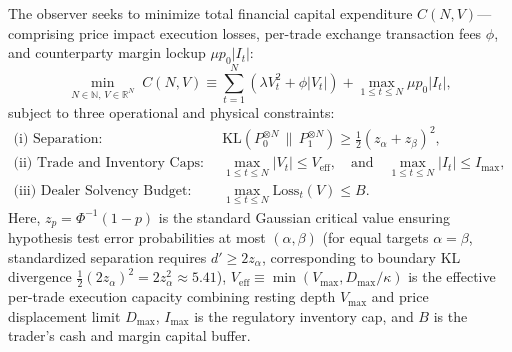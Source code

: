 \documentclass[12pt]{article}
\theoremstyle{definition}
\theoremstyle{remark}
\newcommand{\R}{\mathbb{R}}
\begin{document}
The observer seeks to minimize total financial capital expenditure $C(N, V)$---comprising price impact execution losses, per-trade exchange transaction fees $\phi$, and counterparty margin lockup $\mu p_0 |I_t|$:
\begin{equation}
\min_{N \in \mathbb{N}, \, V \in \R^N} \; C(N, V) \equiv \sum_{t=1}^N \left( \lambda V_t^2 + \phi |V_t| \right) + \max_{1 \le t \le N} \mu p_0 |I_t|,
\label{eq:joint_fift_program}
\end{equation}
subject to three operational and physical constraints:
\begin{align}
\text{(i) Separation:} \quad & \mathrm{KL}(P_0^{\otimes N} \,\|\, P_1^{\otimes N}) \ge \frac{1}{2} (z_\alpha + z_\beta)^2, \label{eq:stat_separation_constraint} \\
\text{(ii) Trade and Inventory Caps:} \quad & \max_{1 \le t \le N} |V_t| \le V_{\mathrm{eff}}, \quad \text{and} \quad \max_{1 \le t \le N} |I_t| \le I_{\max}, \label{eq:market_depth_constraint} \\
\text{(iii) Dealer Solvency Budget:} \quad & \max_{1 \le t \le N} \text{Loss}_t(V) \le B. \label{eq:dealer_solvency_constraint}
\end{align}
Here, $z_p = \Phi^{-1}(1 - p)$ is the standard Gaussian critical value ensuring hypothesis test error probabilities at most $(\alpha, \beta)$ (for equal targets $\alpha = \beta$, standardized separation requires $d' \ge 2 z_\alpha$, corresponding to boundary KL divergence $\frac{1}{2}(2 z_\alpha)^2 = 2 z_\alpha^2 \approx 5.41$), $V_{\mathrm{eff}} \equiv \min(V_{\max}, D_{\max}/\kappa)$ is the effective per-trade execution capacity combining resting depth $V_{\max}$ and price displacement limit $D_{\max}$, $I_{\max}$ is the regulatory inventory cap, and $B$ is the trader's cash and margin capital buffer.
\end{document}
